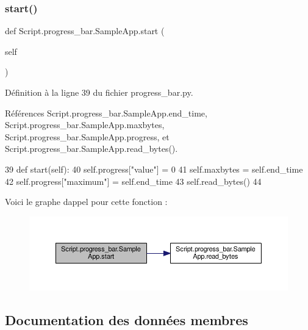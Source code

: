 \subsubsection{\texorpdfstring{start()}{start()}}
{\footnotesize\ttfamily def Script.\+progress\+\_\+bar.\+Sample\+App.\+start (\begin{DoxyParamCaption}\item[{}]{self }\end{DoxyParamCaption})}



Définition à la ligne 39 du fichier progress\+\_\+bar.\+py.



Références Script.\+progress\+\_\+bar.\+Sample\+App.\+end\+\_\+time, Script.\+progress\+\_\+bar.\+Sample\+App.\+maxbytes, Script.\+progress\+\_\+bar.\+Sample\+App.\+progress, et Script.\+progress\+\_\+bar.\+Sample\+App.\+read\+\_\+bytes().


\begin{DoxyCode}
39     \textcolor{keyword}{def }start(self):
40         self.progress[\textcolor{stringliteral}{"value"}] = 0
41         self.maxbytes = self.end\_time
42         self.progress[\textcolor{stringliteral}{"maximum"}] = self.end\_time
43         self.read\_bytes()
44 
\end{DoxyCode}
Voici le graphe d\textquotesingle{}appel pour cette fonction \+:\nopagebreak
\begin{figure}[H]
\begin{center}
\leavevmode
\includegraphics[width=350pt]{classScript_1_1progress__bar_1_1SampleApp_a9c3207958e5b061a0c5c43d986ccb17b_cgraph}
\end{center}
\end{figure}


\subsection{Documentation des données membres}
\mbox{\label{classScript_1_1progress__bar_1_1SampleApp_a9514fa73fb289377cbade22206b07038}} 
